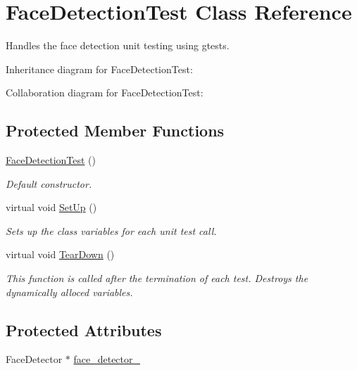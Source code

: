 \hypertarget{classFaceDetectionTest}{\section{Face\-Detection\-Test Class Reference}
\label{classFaceDetectionTest}
}


Handles the face detection unit testing using gtests.  




Inheritance diagram for Face\-Detection\-Test\-:


Collaboration diagram for Face\-Detection\-Test\-:
\subsection*{Protected Member Functions}
\begin{DoxyCompactItemize}
\item 
\hyperlink{classFaceDetectionTest_a5d772e47e60b0f5bd04b541c9ddb19f2}{Face\-Detection\-Test} ()
\begin{DoxyCompactList}\small\item\em Default constructor. \end{DoxyCompactList}\item 
virtual void \hyperlink{classFaceDetectionTest_a112f1e86a2c7296d26eb4fea9cae6e29}{Set\-Up} ()
\begin{DoxyCompactList}\small\item\em Sets up the class variables for each unit test call. \end{DoxyCompactList}\item 
virtual void \hyperlink{classFaceDetectionTest_ac2b70fd8126f26aa1e9b4f0a8a0b7029}{Tear\-Down} ()
\begin{DoxyCompactList}\small\item\em This function is called after the termination of each test. Destroys the dynamically alloced variables. \end{DoxyCompactList}\end{DoxyCompactItemize}
\subsection*{Protected Attributes}
\begin{DoxyCompactItemize}
\item 
Face\-Detector $\ast$ \hyperlink{classFaceDetectionTest_a4bc63bdc4212643f3375fcd9a0c25a11}{face\-\_\-detector\-\_\-}
\end{DoxyCompactItemize}


